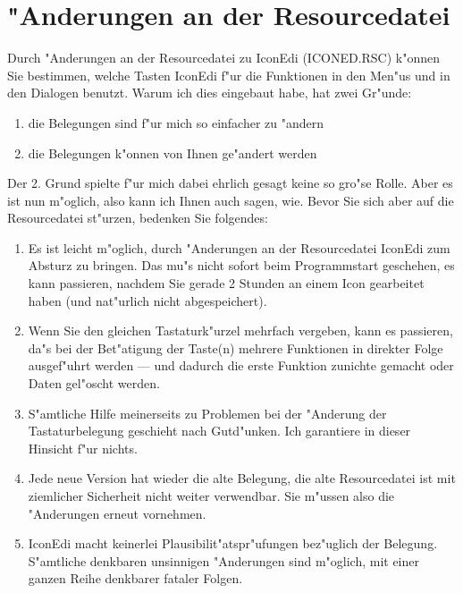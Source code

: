 \section{"Anderungen an der Resourcedatei}
Durch "Anderungen an der Resourcedatei zu IconEdi (ICONED.RSC)
k"onnen Sie bestimmen, welche Tasten IconEdi f"ur die Funktionen
in den Men"us und in den Dialogen benutzt. Warum ich dies
eingebaut habe, hat zwei Gr"unde:
\begin{enumerate}
 \item die Belegungen sind f"ur mich so einfacher zu "andern
 \item die Belegungen k"onnen von Ihnen ge"andert werden
\end{enumerate}

Der 2. Grund spielte f"ur mich dabei ehrlich gesagt keine so gro"se
Rolle. Aber es ist nun m"oglich, also kann ich Ihnen auch sagen,
wie. Bevor Sie sich aber auf die Resourcedatei st"urzen, bedenken
Sie folgendes:
\begin{enumerate}
 \item Es ist leicht m"oglich, durch "Anderungen an der Resourcedatei 
       IconEdi zum Absturz zu bringen. Das mu"s nicht sofort beim
       Programmstart geschehen, es kann passieren, nachdem Sie
       gerade 2 Stunden an einem Icon gearbeitet haben (und 
       nat"urlich nicht abgespeichert).
 \item Wenn Sie den gleichen Tastaturk"urzel mehrfach vergeben, kann
       es passieren, da"s bei der Bet"atigung der Taste(n) mehrere
       Funktionen in direkter Folge ausgef"uhrt werden --- und 
       dadurch die erste Funktion zunichte gemacht oder Daten 
       gel"oscht werden.
 \item S"amtliche Hilfe meinerseits zu Problemen bei der "Anderung
       der Tastaturbelegung geschieht nach Gutd"unken. Ich 
       garantiere in dieser Hinsicht f"ur nichts.
 \item Jede neue Version hat wieder die alte Belegung, die alte
       Resourcedatei ist mit ziemlicher Sicherheit nicht weiter
       verwendbar. Sie m"ussen also die "Anderungen erneut vornehmen.
 \item IconEdi macht keinerlei Plausibilit"atspr"ufungen bez"uglich
       der Belegung. S"amtliche denkbaren unsinnigen "Anderungen
       sind m"oglich, mit einer ganzen Reihe denkbarer fataler 
       Folgen.
\end{enumerate}

